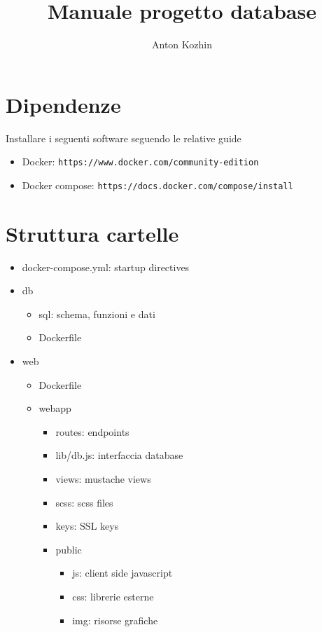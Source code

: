 \documentclass[a4paper]{article}
\title{Manuale progetto database}
\author{Anton Kozhin}
\begin{document}
\maketitle

\section{Dipendenze}
Installare i seguenti software seguendo le relative guide
\begin{itemize}
\item Docker: \verb|https://www.docker.com/community-edition|
\item Docker compose: \verb|https://docs.docker.com/compose/install|
\end{itemize}

\section{Struttura cartelle}
\renewcommand{\labelitemi}{$-$}
\renewcommand{\labelitemii}{$-$}
\renewcommand{\labelitemiii}{$-$}
\renewcommand{\labelitemiv}{$-$}
\begin{itemize}
  \item docker-compose.yml: startup directives
  \item db
  \begin{itemize}  
    \item sql: schema, funzioni e dati
    \item Dockerfile  
  \end{itemize}
  \item web
  \begin{itemize}
    \item Dockerfile
    \item webapp
    \begin{itemize}
      \item routes: endpoints
      \item lib/db.js: interfaccia database
      \item views: mustache views
      \item scss: scss files
      \item keys: SSL keys
      \item public
      \begin{itemize}
        \item js: client side javascript
        \item css: librerie esterne
        \item img: risorse grafiche
      \end{itemize}
    \end{itemize}
  \end{itemize}
\end{itemize}
\end{document}

